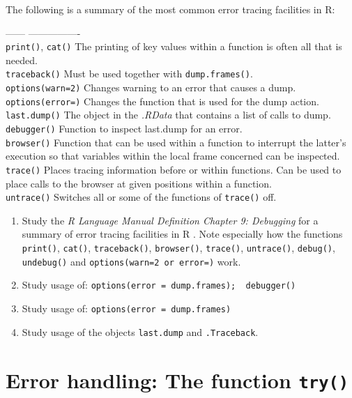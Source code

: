 \documentclass[
]{book}
\begin{document}
The following is a summary of the most common error tracing facilities in R:

------ \textbar{} ---------------- \textbar{}\\
\texttt{print()}, \texttt{cat()} \textbar{} The printing of key values within a function is often all that is needed. \textbar{}\\
\texttt{traceback()} \textbar{} Must be used together with \texttt{dump.frames()}. \textbar{}\\
\texttt{options(warn=2)} \textbar{} Changes warning to an error that causes a dump. \textbar{}\\
\texttt{options(error=)} \textbar{} Changes the function that is used for the dump action. \textbar{}\\
\texttt{last.dump()} \textbar{} The object in the \emph{{.RData}} that contains a list of calls to dump. \textbar{}\\
\texttt{debugger()} \textbar{} Function to inspect last.dump for an error. \textbar{}\\
\texttt{browser()} \textbar{} Function that can be used within a function to interrupt the latter's execution so that variables within the local frame concerned can be inspected. \textbar{}\\
\texttt{trace()} \textbar{} Places tracing information before or within functions. Can be used to place calls to the browser at given positions within a function. \textbar{}\\
\texttt{untrace()} \textbar{} Switches all or some of the functions of \texttt{trace()} off. \textbar{}

\begin{enumerate}
\def\labelenumi{(\alph{enumi})}
\item
  Study the \emph{R Language Manual Definition Chapter 9: Debugging} for a summary of error tracing facilities in R . Note especially how the functions \texttt{print()}, \texttt{cat()}, \texttt{traceback()}, \texttt{browser()}, \texttt{trace()}, \texttt{untrace()}, \texttt{debug()}, \texttt{undebug()} and \texttt{options(warn=2\ or\ error=)} work.
\item
  Study usage of: \texttt{options(error\ =\ dump.frames);\ \ debugger()}
\item
  Study usage of: \texttt{options(error\ =\ dump.frames)}
\item
  Study usage of the objects \texttt{last.dump} and \texttt{.Traceback}.
\end{enumerate}

\section{\texorpdfstring{Error handling: The function \texttt{try()}}{Error handling: The function try()}}\label{error-handling-the-function-try}
\end{document}
